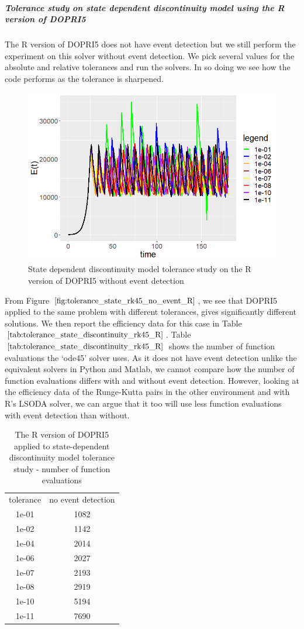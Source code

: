 \subparagraph{Tolerance study on state dependent discontinuity model using the R version of DOPRI5}
The R version of DOPRI5 does not have event detection but we still perform the experiment on this solver without event detection. We pick several values for the absolute and relative tolerances and run the solvers. In so doing we see how the code performs as the tolerance is sharpened. 

\begin{figure}[h]
\centering
\includegraphics[width=0.7\linewidth]{./figures/tolerance_state_rk45_no_event_R}
\caption{State dependent discontinuity model tolerance study on the R version of DOPRI5 without event detection}
\label{fig:tolerance_state_rk45_no_event_R}
\end{figure}

From Figure $\ref{fig:tolerance_state_rk45_no_event_R}$, we see that DOPRI5 applied to the same problem with different tolerances, gives significantly different solutions. We then report the efficiency data for this case in Table $\ref{tab:tolerance_state_discontinuity_rk45_R}$. Table $\ref{tab:tolerance_state_discontinuity_rk45_R}$ shows the number of function evaluations the `ode45' solver uses. As it does not have event detection unlike the equivalent solvers in Python and Matlab, we cannot compare how the number of function evaluations differs with and without event detection. However, looking at the efficiency data of the Runge-Kutta pairs in the other environment and with R's LSODA solver, we can argue that it too will use less function evaluations with event detection than without.

\begin{table}[h]
\caption {The R version of DOPRI5 applied to state-dependent discontinuity model tolerance study - number of function evaluations} \label{tab:tolerance_state_discontinuity_rk45_R} 
\begin{center}
\begin{tabular}{ c c }
tolerance & no event detection \\
1e-01 & 1082 \\
1e-02 & 1142 \\
1e-04 & 2014 \\
1e-06 & 2027 \\
1e-07 & 2193 \\
1e-08 & 2919 \\
1e-10 & 5194 \\
1e-11 & 7690 \\
\end{tabular}
\end{center}
\end{table}

